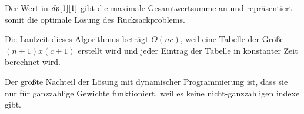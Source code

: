 Der Wert in $\mathit{dp}[1][1]$ gibt die maximale Gesamtwertsumme an und 
repräsentiert somit die optimale Lösung des Rucksackproblems.

Die Laufzeit dieses Algorithmus beträgt $O(nc)$, weil 
eine Tabelle der Größe $(n+1) x (c+1)$ erstellt wird und 
jeder Eintrag der Tabelle in konstanter Zeit berechnet wird.

Der größte Nachteil der Lösung mit dynamischer Programmierung ist, dass 
sie nur für ganzzahlige Gewichte funktioniert, weil es keine nicht-ganzzahligen 
indexe gibt.\ \cite[vgl.]{Martello1987}